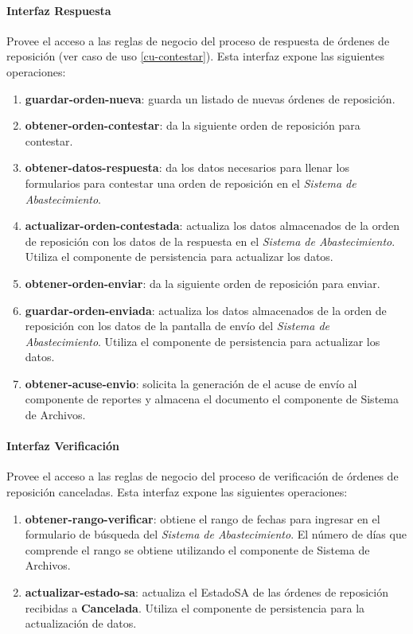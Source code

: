 \paragraph{\indent Interfaz Respuesta\\}
Provee el acceso a las reglas de negocio del proceso de respuesta de órdenes de reposición (ver caso de uso \ref{cu-contestar}). Esta interfaz expone las siguientes operaciones:
\begin{enumerate}
	\item \textbf{guardar-orden-nueva}: guarda un listado de nuevas órdenes de reposición.
	\item \textbf{obtener-orden-contestar}: da la siguiente orden de reposición para contestar.
	\item \textbf{obtener-datos-respuesta}: da los datos necesarios para llenar los formularios para contestar una orden de reposición en el \textit{Sistema de Abastecimiento}.
	\item \textbf{actualizar-orden-contestada}: actualiza los datos almacenados de la orden de reposición con los datos de la respuesta en el \textit{Sistema de Abastecimiento}. Utiliza el componente de persistencia para actualizar los datos.
	\item \textbf{obtener-orden-enviar}: da la siguiente orden de reposición para enviar.
	\item \textbf{guardar-orden-enviada}: actualiza los datos almacenados de la orden de reposición con los datos de la pantalla de envío del \textit{Sistema de Abastecimiento}. Utiliza el componente de persistencia para actualizar los datos.
	\item \textbf{obtener-acuse-envio}: solicita la generación de el acuse de envío al componente de reportes y almacena el documento el componente de Sistema de Archivos.
\end{enumerate}

\paragraph{\indent Interfaz Verificación\\}
Provee el acceso a las reglas de negocio del proceso de verificación de órdenes de reposición canceladas. Esta interfaz expone las siguientes operaciones:
\begin{enumerate}
	\item \textbf{obtener-rango-verificar}: obtiene el rango de fechas para ingresar en el formulario de búsqueda del \textit{Sistema de Abastecimiento}. El número de días que comprende el rango se obtiene utilizando el componente de Sistema de Archivos.
	\item \textbf{actualizar-estado-sa}: actualiza el EstadoSA de las órdenes de reposición recibidas a \textbf{Cancelada}. Utiliza el componente de persistencia para la actualización de datos.
\end{enumerate}

